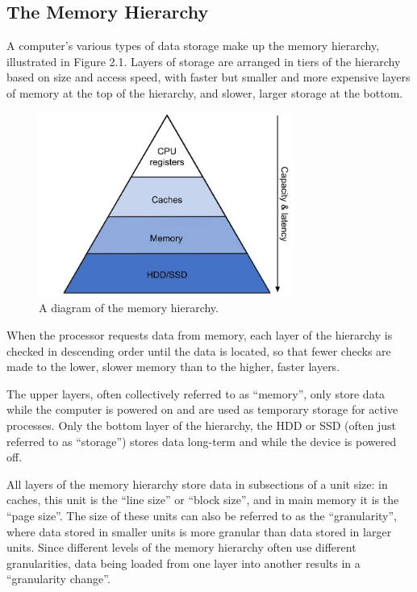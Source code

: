 \documentclass[12pt,twoside]{reedthesis}
\begin{document}
	\subsection*{The Memory Hierarchy}

	A computer's various types of data storage make up the memory hierarchy, illustrated in Figure 2.1. Layers of storage are arranged in tiers of the hierarchy based on size and access speed, with faster but smaller and more expensive layers of memory at the top of the hierarchy, and slower, larger storage at the bottom.
	\begin{figure}[h]
    	\centering
    	\includegraphics[width=3.3in]{figures/mem_hierarchy.jpg}
    	\caption{A diagram of the memory hierarchy.}
	\end{figure}

	When the processor requests data from memory, each layer of the hierarchy is checked in descending order until the data is located, so that fewer checks are made to the lower, slower memory than to the higher, faster layers.

	The upper layers, often collectively referred to as ``memory'', only store data while the computer is powered on and are used as temporary storage for active processes. Only the bottom layer of the hierarchy, the HDD or SSD (often just referred to as ``storage'') stores data long-term and while the device is powered off.

	All layers of the memory hierarchy store data in subsections of a unit size: in caches, this unit is the ``line size'' or ``block size'', and in main memory it is the ``page size''. The size of these units can also be referred to as the ``granularity'', where data stored in smaller units is more granular than data stored in larger units. Since different levels of the memory hierarchy often use different granularities, data being loaded from one layer into another results in a ``granularity change''.
\end{document}
